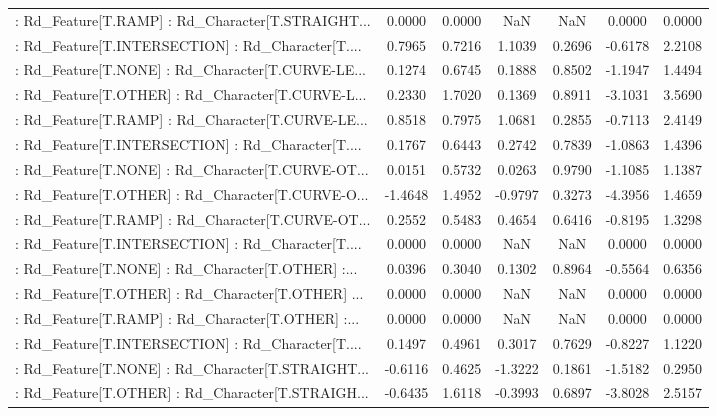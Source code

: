 \begin{longtable}{p{4cm}cccccc}
 : Rd\_Feature[T.RAMP] : Rd\_Character[T.STRAIGHT... &  0.0000 &    0.0000 &     NaN &          NaN &  0.0000 &  0.0000 \\
 : Rd\_Feature[T.INTERSECTION] : Rd\_Character[T.... &  0.7965 &    0.7216 &  1.1039 &       0.2696 & -0.6178 &  2.2108 \\
 : Rd\_Feature[T.NONE] : Rd\_Character[T.CURVE-LE... &  0.1274 &    0.6745 &  0.1888 &       0.8502 & -1.1947 &  1.4494 \\
 : Rd\_Feature[T.OTHER] : Rd\_Character[T.CURVE-L... &  0.2330 &    1.7020 &  0.1369 &       0.8911 & -3.1031 &  3.5690 \\
 : Rd\_Feature[T.RAMP] : Rd\_Character[T.CURVE-LE... &  0.8518 &    0.7975 &  1.0681 &       0.2855 & -0.7113 &  2.4149 \\
 : Rd\_Feature[T.INTERSECTION] : Rd\_Character[T.... &  0.1767 &    0.6443 &  0.2742 &       0.7839 & -1.0863 &  1.4396 \\
 : Rd\_Feature[T.NONE] : Rd\_Character[T.CURVE-OT... &  0.0151 &    0.5732 &  0.0263 &       0.9790 & -1.1085 &  1.1387 \\
 : Rd\_Feature[T.OTHER] : Rd\_Character[T.CURVE-O... & -1.4648 &    1.4952 & -0.9797 &       0.3273 & -4.3956 &  1.4659 \\
 : Rd\_Feature[T.RAMP] : Rd\_Character[T.CURVE-OT... &  0.2552 &    0.5483 &  0.4654 &       0.6416 & -0.8195 &  1.3298 \\
 : Rd\_Feature[T.INTERSECTION] : Rd\_Character[T.... &  0.0000 &    0.0000 &     NaN &          NaN &  0.0000 &  0.0000 \\
 : Rd\_Feature[T.NONE] : Rd\_Character[T.OTHER] :... &  0.0396 &    0.3040 &  0.1302 &       0.8964 & -0.5564 &  0.6356 \\
 : Rd\_Feature[T.OTHER] : Rd\_Character[T.OTHER] ... &  0.0000 &    0.0000 &     NaN &          NaN &  0.0000 &  0.0000 \\
 : Rd\_Feature[T.RAMP] : Rd\_Character[T.OTHER] :... &  0.0000 &    0.0000 &     NaN &          NaN &  0.0000 &  0.0000 \\
 : Rd\_Feature[T.INTERSECTION] : Rd\_Character[T.... &  0.1497 &    0.4961 &  0.3017 &       0.7629 & -0.8227 &  1.1220 \\
 : Rd\_Feature[T.NONE] : Rd\_Character[T.STRAIGHT... & -0.6116 &    0.4625 & -1.3222 &       0.1861 & -1.5182 &  0.2950 \\
 : Rd\_Feature[T.OTHER] : Rd\_Character[T.STRAIGH... & -0.6435 &    1.6118 & -0.3993 &       0.6897 & -3.8028 &  2.5157 \\

\end{longtable}
